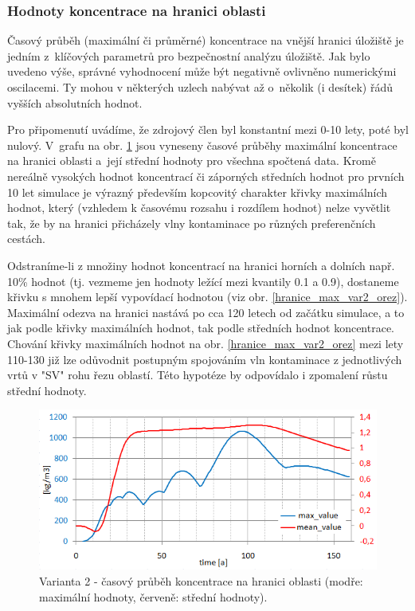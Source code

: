 \documentclass[11pt,a4paper]{article}
\newcommand{\obraz}[1]{(viz obr. \ref{#1})}
\begin{document}
\begin{onehalfspacing}
\newpage
\subsubsection{Hodnoty koncentrace na hranici oblasti} Časový průběh (maximální či průměrné) koncentrace na vnější hranici úložiště je jedním z~klíčo\-vých parametrů pro bezpečnostní analýzu úložiště. Jak bylo uvedeno výše, správné vyhodnocení může být negativně ovlivněno numerickými oscilacemi. Ty mohou v některých uzlech nabývat až o~několik (i desítek) řádů vyšších absolutních hodnot.

Pro připomenutí uvádíme, že zdrojový člen byl konstantní mezi 0-10 lety, poté byl nulový. V~grafu na obr. \ref{hranice_max_var2} jsou vyneseny časové průběhy maximální koncentrace na hranici oblasti a~její střední hodnoty pro všechna spočtená data. Kromě nereálně vysokých hodnot koncentrací či záporných středních hodnot pro prvních 10 let simulace je výrazný především kopcovitý charakter křivky maximálních hodnot, který (vzhledem k časovému rozsahu i rozdílem hodnot) nelze vyvětlit tak, že by na hranici přicházely vlny kontaminace po různých preferenčních cestách.

Odstraníme-li z množiny hodnot koncentrací na hranici horních a dolních např. 10\% hodnot (tj. vezmeme jen hodnoty ležící mezi kvantily 0.1 a 0.9), dostaneme křivku s mnohem lepší vypovídací hodnotou \obraz{hranice_max_var2_orez}. Maximální odezva na hranici nastává po cca 120 letech od začátku simulace, a to jak podle křivky maximálních hodnot, tak podle středních hodnot koncentrace. Chování křivky maximálních hodnot na obr. \ref{hranice_max_var2_orez} mezi lety 110-130 již lze odůvodnit postupným spojováním vln kontaminace z jednotlivých vrtů v "SV" rohu řezu oblastí. Této hypotéze by odpovídalo i zpomalení růstu střední hodnoty.

\begin{figure}[H]
\centering
\includegraphics{graphics/obr_ralek/var2/hranice_max_var2.png}
\caption{Varianta 2 - časový průběh koncentrace na hranici oblasti (modře: maximální hodnoty, červeně: střední hodnoty).}
\label{hranice_max_var2}
\end{figure}


\end{onehalfspacing}
\end{document}
